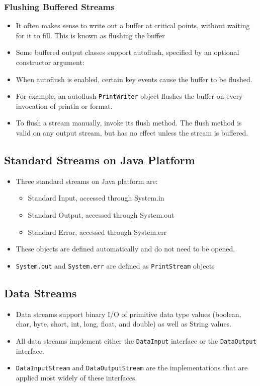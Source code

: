 \documentclass[11pt,a4paper]{article}
\begin{document}
\subsubsection*{Flushing Buffered Streams}
\begin{itemize}
    \item It often makes sense to write out a buffer at critical points, without waiting for it to fill. This is known as flushing the buffer
    \item Some buffered output classes support autoflush, specified by an optional constructor argument: 
    \item When autoflush is enabled, certain key events cause the buffer to be flushed.
    \item For example, an autoflush \texttt{PrintWriter} object flushes the buffer on every invocation of println or format. 
    \item To flush a stream manually, invoke its flush method. The flush method is valid on any output stream, but has no effect unless the stream is buffered. 
\end{itemize}

\subsection*{Standard Streams on Java Platform}
\begin{itemize}
    \item Three standard streams on Java platform are: 
        \begin{itemize}
            \item Standard Input, accessed through System.in 
            \item Standard Output, accessed through System.out 
            \item Standard Error, accessed through System.err 
        \end{itemize}
    \item These objects are defined automatically and do not need to be opened. 
    \item \texttt{System.out} and \texttt{System.err} are defined as \texttt{PrintStream} objects
\end{itemize}
\subsection*{Data Streams}
\begin{itemize}
    \item Data streams support binary I/O of primitive data type values (boolean, char, byte, short, int, long, float, and double) as well as String values. 
    \item All data streams implement either the \texttt{DataInput} interface or the \texttt{DataOutput} interface. 
    \item \texttt{DataInputStream} and \texttt{DataOutputStream} are the implementations that are applied most widely of these interfaces. 
\end{itemize}
\end{document}
